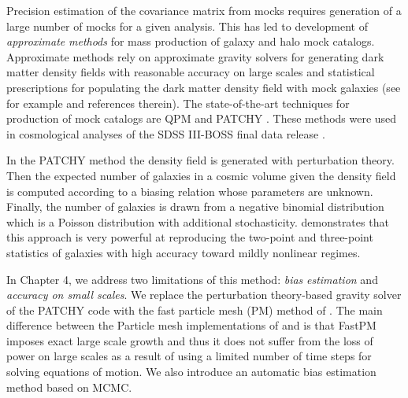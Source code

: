 Precision estimation of the covariance matrix from mocks requires generation of a large number of mocks for a given analysis. This has led to development of \emph{approximate} \emph{methods} for mass production of galaxy and halo mock catalogs. Approximate methods rely on approximate gravity solvers for generating dark matter density fields with reasonable accuracy on large scales and statistical prescriptions for populating the dark matter density field with mock galaxies (see for example \citealt{manera2013,qpm,eazymock,kitaura2016} and references 
therein). The state-of-the-art techniques for production of mock catalogs are QPM \citep{qpm} and PATCHY \citep{kitaura2016}. These methods were used in 
cosmological analyses of the SDSS III-BOSS final data release \citep{alam2016}.

In the PATCHY method the density field is generated with perturbation theory. Then the expected number of galaxies in a cosmic volume given the density field is computed according to a biasing relation whose parameters are unknown. 
Finally, the number of galaxies is drawn from a negative binomial distribution which is a Poisson distribution with additional stochasticity. 
\citet{nifty} demonstrates that this approach is very powerful at reproducing the two-point and three-point statistics of galaxies with high accuracy toward mildly nonlinear regimes.

In Chapter 4, we address two limitations of this method: \emph{bias} \emph{estimation} and \emph{accuracy on small scales}. We replace the perturbation theory-based 
gravity solver of the PATCHY code with the fast particle mesh (PM) method of \citet{fastpm}. The main difference between the Particle mesh implementations of \citet{fastpm} and \citet{qpm} is that 
FastPM imposes exact large scale growth and thus it does not suffer from the loss of power on large scales as a result of using a limited number of time steps for solving equations of motion. We also introduce an automatic bias estimation method based on MCMC. 

